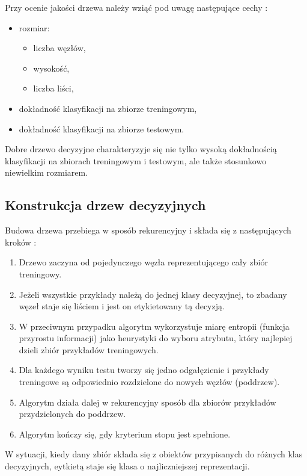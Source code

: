 Przy ocenie jakości drzewa należy wziąć pod uwagę następujące cechy \cite{treeMIMUW}:

\begin{itemize}
	\item rozmiar:
		\begin{itemize}
			\item liczba węzłów,
			\item wysokość,
			\item liczba liści,
		\end{itemize}
	\item dokładność klasyfikacji na zbiorze treningowym,
	\item dokładność klasyfikacji na zbiorze testowym.
\end{itemize}
Dobre drzewo decyzyjne charakteryzyje się nie tylko wysoką dokładnością klasyfikacji na zbiorach treningowym i testowym, ale także stosunkowo niewielkim rozmiarem.

\subsection{Konstrukcja drzew decyzyjnych}

Budowa drzewa przebiega w sposób rekurencyjny i składa się z następujących kroków \cite{PJWSTK}:

\begin{enumerate}
	\item Drzewo zaczyna od pojedynczego węzła reprezentującego cały zbiór treningowy.
	\item Jeżeli wszystkie przykłady należą do jednej klasy decyzyjnej, to zbadany węzeł staje się liściem i jest on etykietowany tą decyzją.
	\item W przeciwnym przypadku algorytm wykorzystuje miarę entropii (funkcja przyrostu informacji) jako heurystyki do wyboru atrybutu, który najlepiej dzieli zbiór przykładów treningowych.
	\item Dla każdego wyniku testu tworzy się jedno odgałęzienie i przykłady treningowe są odpowiednio rozdzielone do nowych węzłów (poddrzew).
	\item Algorytm działa dalej w rekurencyjny sposób dla zbiorów przykładów przydzielonych do poddrzew.
	\item Algorytm kończy się, gdy kryterium stopu jest spełnione.
\end{enumerate}
W sytuacji, kiedy dany zbiór składa się z obiektów przypisanych do różnych klas decyzyjnych, eytkietą staje się klasa o najliczniejszej reprezentacji.

